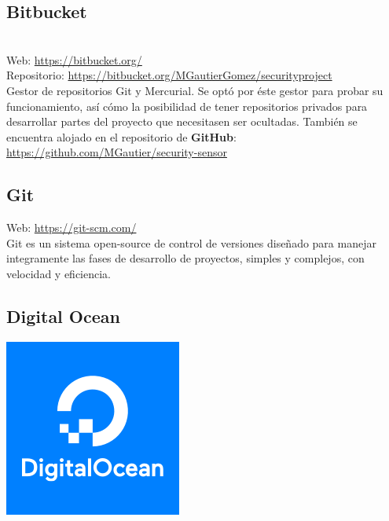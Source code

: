 \subsection{Bitbucket}

\\

Web: \url{https://bitbucket.org/}\\
Repositorio: \url{https://bitbucket.org/MGautierGomez/securityproject}\\

Gestor de repositorios Git y Mercurial. Se optó por éste gestor para probar su funcionamiento, así cómo la posibilidad de tener repositorios privados para desarrollar partes del proyecto que necesitasen ser ocultadas. También se encuentra alojado en el repositorio de \textbf{GitHub}: \url{https://github.com/MGautier/security-sensor}\\

\subsection{Git}


Web: \url{https://git-scm.com/}\\

Git es un sistema open-source de control de versiones diseñado para manejar integramente las fases de desarrollo de proyectos, simples y complejos, con velocidad y eficiencia.\\

\subsection{Digital Ocean}

\begin{center}\includegraphics[scale=0.35]{diagramas/docean-logo.png}\end{center}


